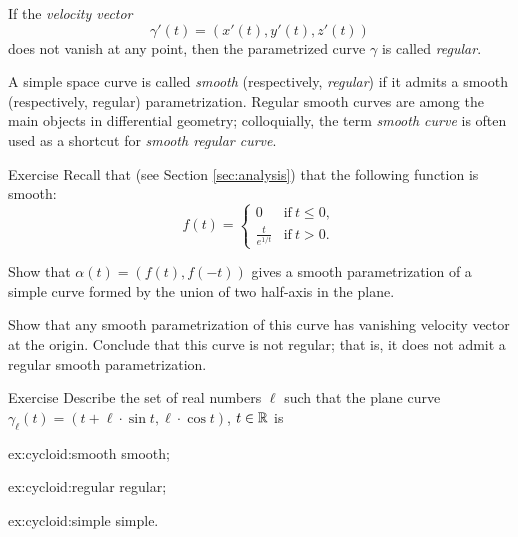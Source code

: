 If the \emph{velocity vector} 
\[\gamma'(t)=(x'(t),y'(t),z'(t))\] 
does not vanish at any point, then the parametrized curve $\gamma$ is called \emph{regular}.

A simple space curve is called \emph{smooth} (respectively, \emph{regular}) if it admits a smooth (respectively, regular) parametrization.
Regular smooth curves are among the main objects in differential geometry;
colloquially, the term \emph{smooth curve} is often used as a shortcut for {}\emph{smooth regular curve}. 

\begin{thm}{Exercise}\label{ex:L-shape}
Recall that (see Section \ref{sec:analysis}) that the following function is smooth: 
\[f(t)=
\begin{cases}
0&\text{if}\ t\le 0,
\\
\frac{t}{e^{1\!/\!t}}&\text{if}\ t> 0.
\end{cases}
\]

Show that $\alpha(t)=(f(t),f(-t))$ gives a smooth parametrization of a simple curve formed by the union of two half-axis in the plane.

Show that any smooth parametrization of this curve has vanishing velocity vector at the origin.
Conclude that this curve is not regular;
that is, it does not admit a regular smooth parametrization.
\end{thm}


\begin{thm}{Exercise}\label{ex:cycloid}
Describe the set of real numbers $\ell$
such that the plane curve $\gamma_\ell (t)= (t+\ell \cdot \sin t,\ell \cdot \cos t)$, $t\in\mathbb{R}$ is

\begin{minipage}{.30\textwidth}
\begin{subthm}{ex:cycloid:smooth}
smooth; 
\end{subthm}
\end{minipage}
\hfill
\begin{minipage}{.30\textwidth}
\begin{subthm}{ex:cycloid:regular}
regular;
\end{subthm}
\end{minipage}
\hfill
\begin{minipage}{.30\textwidth}
\begin{subthm}{ex:cycloid:simple}
simple.
\end{subthm}
\end{minipage}

\end{thm}

